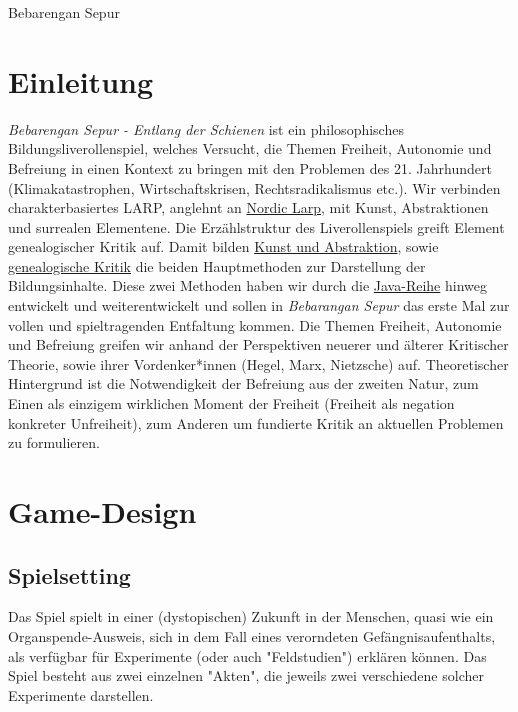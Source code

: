 \documentclass[a4paper, 12pt]{scrartcl}
\begin{document}
    \begin{titlepage}
        \begin{center}
            \large {Bebarengan Sepur}
        \end{center}
    \end{titlepage}
    \tableofcontents

    \section{Einleitung}
    \textit{Bebarengan Sepur - Entlang der Schienen} ist ein philosophisches Bildungsliverollenspiel, welches Versucht, die Themen Freiheit, Autonomie und Befreiung in einen Kontext zu bringen mit den Problemen des 21. Jahrhundert (Klimakatastrophen, Wirtschaftskrisen, Rechtsradikalismus etc.). 
    Wir verbinden charakterbasiertes LARP, anglehnt an \hyperref[nordic-larp]{Nordic Larp}, mit Kunst, Abstraktionen und surrealen Elementene. 
    Die Erzählstruktur des Liverollenspiels greift Element genealogischer Kritik auf. 
    Damit bilden \hyperref[kunst-abstraktion]{Kunst und Abstraktion}, sowie \hyperref[genealogische-kritik]{genealogische Kritik} die beiden Hauptmethoden zur Darstellung der Bildungsinhalte. 
    Diese zwei Methoden haben wir durch die \hyperref[java-reihe]{Java-Reihe} hinweg entwickelt und weiterentwickelt und sollen in \textit{Bebarangan Sepur} das erste Mal zur vollen und spieltragenden Entfaltung kommen. 
    Die Themen Freiheit, Autonomie und Befreiung greifen wir anhand der Perspektiven neuerer und älterer Kritischer Theorie, sowie ihrer Vordenker*innen (Hegel, Marx, Nietzsche) auf. 
    Theoretischer Hintergrund ist die Notwendigkeit der Befreiung aus der zweiten Natur, zum Einen als einzigem wirklichen Moment der Freiheit (Freiheit als negation konkreter Unfreiheit), zum Anderen um fundierte Kritik an aktuellen Problemen zu formulieren.

    \section{Game-Design}
    \subsection{Spielsetting}
    Das Spiel spielt in einer (dystopischen) Zukunft in der Menschen, quasi wie ein Organspende-Ausweis, sich in dem Fall eines verorndeten Gefängnisaufenthalts, als verfügbar für Experimente (oder auch "Feldstudien") erklären können. 
    Das Spiel besteht aus zwei einzelnen "Akten", die jeweils zwei verschiedene solcher Experimente darstellen.
\end{document}
